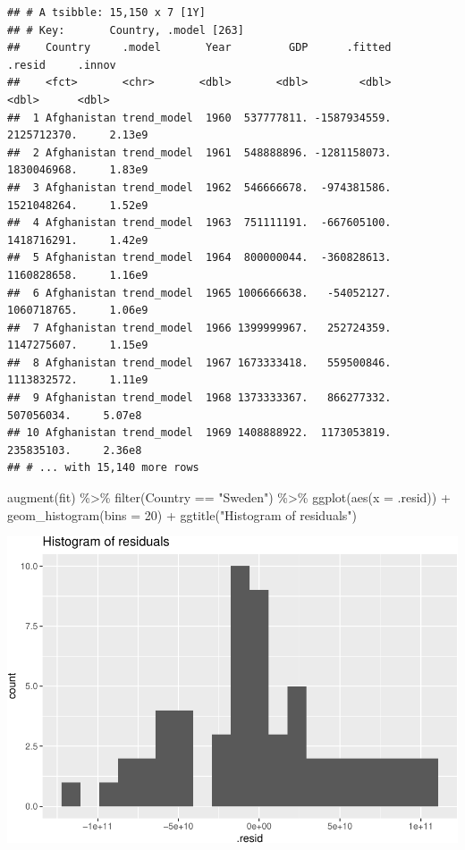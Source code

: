 \documentclass[
]{book}
\newenvironment{Shaded}{\begin{snugshade}}{\end{snugshade}}
\newcommand{\AttributeTok}[1]{\textcolor[rgb]{0.77,0.63,0.00}{#1}}
\newcommand{\DecValTok}[1]{\textcolor[rgb]{0.00,0.00,0.81}{#1}}
\newcommand{\FunctionTok}[1]{\textcolor[rgb]{0.00,0.00,0.00}{#1}}
\newcommand{\NormalTok}[1]{#1}
\newcommand{\SpecialCharTok}[1]{\textcolor[rgb]{0.00,0.00,0.00}{#1}}
\newcommand{\StringTok}[1]{\textcolor[rgb]{0.31,0.60,0.02}{#1}}
\begin{document}
\begin{verbatim}
## # A tsibble: 15,150 x 7 [1Y]
## # Key:       Country, .model [263]
##    Country     .model       Year         GDP      .fitted      .resid     .innov
##    <fct>       <chr>       <dbl>       <dbl>        <dbl>       <dbl>      <dbl>
##  1 Afghanistan trend_model  1960  537777811. -1587934559. 2125712370.     2.13e9
##  2 Afghanistan trend_model  1961  548888896. -1281158073. 1830046968.     1.83e9
##  3 Afghanistan trend_model  1962  546666678.  -974381586. 1521048264.     1.52e9
##  4 Afghanistan trend_model  1963  751111191.  -667605100. 1418716291.     1.42e9
##  5 Afghanistan trend_model  1964  800000044.  -360828613. 1160828658.     1.16e9
##  6 Afghanistan trend_model  1965 1006666638.   -54052127. 1060718765.     1.06e9
##  7 Afghanistan trend_model  1966 1399999967.   252724359. 1147275607.     1.15e9
##  8 Afghanistan trend_model  1967 1673333418.   559500846. 1113832572.     1.11e9
##  9 Afghanistan trend_model  1968 1373333367.   866277332.  507056034.     5.07e8
## 10 Afghanistan trend_model  1969 1408888922.  1173053819.  235835103.     2.36e8
## # ... with 15,140 more rows
\end{verbatim}

\begin{Shaded}
\begin{Highlighting}[]
\FunctionTok{augment}\NormalTok{(fit) }\SpecialCharTok{\%\textgreater{}\%} \FunctionTok{filter}\NormalTok{(Country }\SpecialCharTok{==} \StringTok{"Sweden"}\NormalTok{) }\SpecialCharTok{\%\textgreater{}\%}
  \FunctionTok{ggplot}\NormalTok{(}\FunctionTok{aes}\NormalTok{(}\AttributeTok{x =}\NormalTok{ .resid)) }\SpecialCharTok{+}
  \FunctionTok{geom\_histogram}\NormalTok{(}\AttributeTok{bins =} \DecValTok{20}\NormalTok{) }\SpecialCharTok{+}
  \FunctionTok{ggtitle}\NormalTok{(}\StringTok{"Histogram of residuals"}\NormalTok{)}
\end{Highlighting}
\end{Shaded}

\includegraphics{graphics/unnamed-chunk-36-1.pdf}
\end{document}
